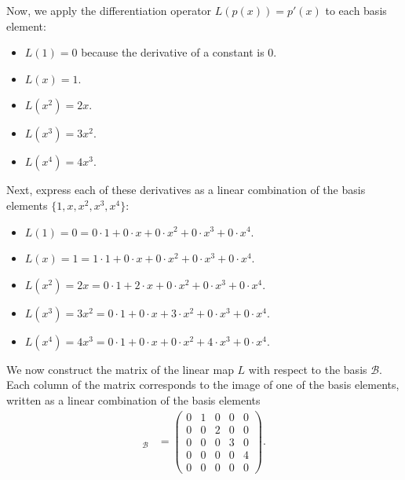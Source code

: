 \documentclass{report}
\begin{document}
\begin{itemize}
            \bigbreak \noindent 
            Now, we apply the differentiation operator \( L(p(x)) = p'(x) \) to each basis element:
            \begin{itemize}
                \item \( L(1) = 0 \) because the derivative of a constant is 0.
                \item \( L(x) = 1 \).
                \item \( L(x^2) = 2x \).
                \item \( L(x^3) = 3x^2 \).
                \item \( L(x^4) = 4x^3 \).
            \end{itemize}
            Next, express each of these derivatives as a linear combination of the basis elements \( \{1, x, x^2, x^3, x^4\} \):
            \begin{itemize}
                \item \( L(1) = 0 = 0 \cdot 1 + 0 \cdot x + 0 \cdot x^2 + 0 \cdot x^3 + 0 \cdot x^4 \).
                \item \( L(x) = 1 = 1 \cdot 1 + 0 \cdot x + 0 \cdot x^2 + 0 \cdot x^3 + 0 \cdot x^4 \).
                \item \( L(x^2) = 2x = 0 \cdot 1 + 2 \cdot x + 0 \cdot x^2 + 0 \cdot x^3 + 0 \cdot x^4 \).
                \item \( L(x^3) = 3x^2 = 0 \cdot 1 + 0 \cdot x + 3 \cdot x^2 + 0 \cdot x^3 + 0 \cdot x^4 \).
                \item \( L(x^4) = 4x^3 = 0 \cdot 1 + 0 \cdot x + 0 \cdot x^2 + 4 \cdot x^3 + 0 \cdot x^4 \).
            \end{itemize}
            \bigbreak \noindent 
            We now construct the matrix of the linear map $L$ with respect to the basis $\mathcal{B}$. Each column of the matrix corresponds to the image of one of the basis elements, written as a linear combination of the basis elements
            \begin{align*}
                [L]_{\mathcal{B}} &= \begin{pmatrix} 0 & 1 & 0 & 0 & 0 \\ 0 & 0 & 2 & 0 & 0 \\ 0 & 0 & 0 & 3 & 0 \\ 0& 0 & 0 & 0 & 4\\ 0 & 0 & 0 & 0 &0 \end{pmatrix}
            .\end{align*}
            \bigbreak \noindent 
            \begin{itemize}

\end{itemize}
\end{itemize}
\end{document}
